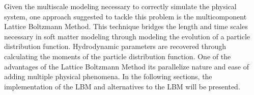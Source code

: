 Given the multiscale modeling necessary to correctly simulate the physical system, one approach suggested to tackle this problem is the multicomponent
Lattice Boltzmann Method. This technique bridges the length and time scales necessary in soft matter modeling through modeling the evolution of a particle
distribution function. Hydrodynamic parameters are recovered through calculating the moments of the particle distribution function. One of the advantages of
the Lattice Boltzmann Method its parallelize nature and ease of adding multiple physical phenomena. In the following sections, the implementation of the LBM
and alternatives to the LBM will be presented.







